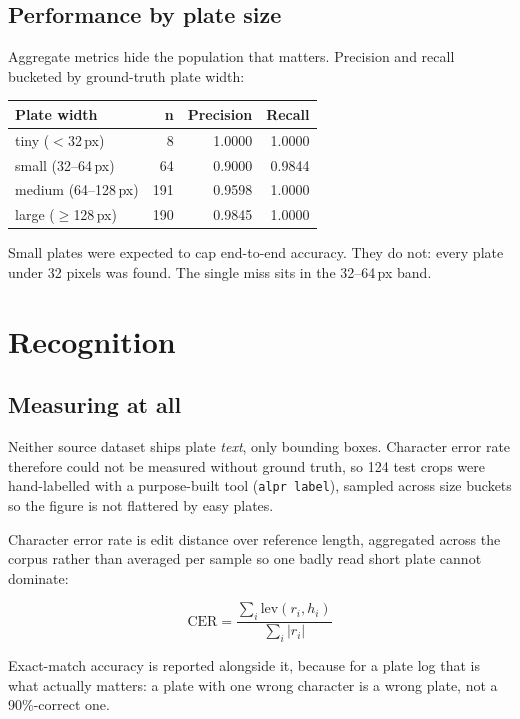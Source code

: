 \documentclass[11pt,a4paper]{article}
\begin{document}
\subsection{Performance by plate size}

Aggregate metrics hide the population that matters. Precision and recall
bucketed by ground-truth plate width:

\begin{center}
\small
\begin{tabular}{@{}lrrr@{}}
\toprule
\textbf{Plate width} & \textbf{n} & \textbf{Precision} & \textbf{Recall} \\
\midrule
tiny ($<$32\,px)      & 8   & 1.0000 & 1.0000 \\
small (32--64\,px)    & 64  & 0.9000 & 0.9844 \\
medium (64--128\,px)  & 191 & 0.9598 & 1.0000 \\
large ($\geq$128\,px) & 190 & 0.9845 & 1.0000 \\
\bottomrule
\end{tabular}
\end{center}

Small plates were expected to cap end-to-end accuracy. They do not: every plate
under 32 pixels was found. The single miss sits in the 32--64\,px band.

\newpage
\section{Recognition}

\subsection{Measuring at all}

Neither source dataset ships plate \emph{text}, only bounding boxes. Character
error rate therefore could not be measured without ground truth, so 124 test
crops were hand-labelled with a purpose-built tool (\texttt{alpr label}), sampled
across size buckets so the figure is not flattered by easy plates.

Character error rate is edit distance over reference length, aggregated across
the corpus rather than averaged per sample so one badly read short plate cannot
dominate:

\[
\mathrm{CER} = \frac{\sum_i \mathrm{lev}(r_i, h_i)}{\sum_i |r_i|}
\]

Exact-match accuracy is reported alongside it, because for a plate log that is
what actually matters: a plate with one wrong character is a wrong plate, not a
90\%-correct one.
\end{document}
